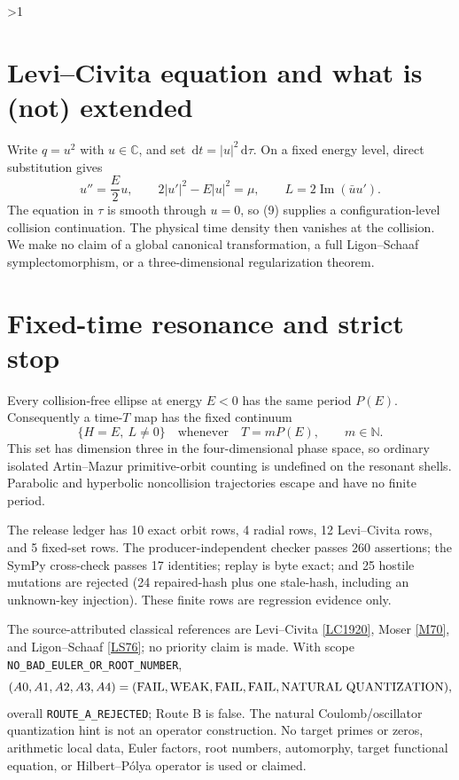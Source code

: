 \documentclass[9pt]{extarticle}
\newcommand{\C}{\mathbb C}
\newcommand{\dd}{\,\mathrm d}
\begin{document}
\ifnum\CRevisionRound>1
\section{Levi--Civita equation and what is (not) extended}
Write \(q=u^2\) with \(u\in\C\), and set \(\dd t=|u|^2\dd\tau\).  On a fixed
energy level, direct substitution gives
\begin{equation}
 u''=\frac E2u,\qquad 2|u'|^2-E|u|^2=\mu,\qquad
 L=2\operatorname{Im}(\bar u u').                           \tag{9}
\end{equation}
The equation in \(\tau\) is smooth through \(u=0\), so (9) supplies a
configuration-level collision continuation.  The physical time density then
vanishes at the collision.  We make no claim of a global canonical
transformation, a full Ligon--Schaaf symplectomorphism, or a three-dimensional
regularization theorem.

\section{Fixed-time resonance and strict stop}
Every collision-free ellipse at energy \(E<0\) has the same period \(P(E)\).
Consequently a time-\(T\) map has the fixed continuum
\[
 \{H=E,\ L\ne0\}\quad\text{whenever}\quad T=mP(E),\qquad m\in\mathbb N. \tag{10}
\]
This set has dimension three in the four-dimensional phase space, so ordinary
isolated Artin--Mazur primitive-orbit counting is undefined on the resonant
shells.  Parabolic and hyperbolic noncollision trajectories escape and have no
finite period.

The release ledger has 10 exact orbit rows, 4 radial rows, 12 Levi--Civita rows,
and 5 fixed-set rows.  The producer-independent checker passes 260 assertions;
the SymPy cross-check passes 17 identities; replay is byte exact; and 25
hostile mutations are rejected (24 repaired-hash plus one stale-hash, including
an unknown-key injection).  These finite rows are regression evidence only.

The source-attributed classical references are Levi--Civita
\href{https://doi.org/10.1007/BF02404404}{[LC1920]}, Moser
\href{https://doi.org/10.1002/cpa.3160230406}{[M70]}, and Ligon--Schaaf
\href{https://doi.org/10.1016/0034-4877(76)90061-6}{[LS76]}; no priority claim
is made.  With scope \texttt{NO\_BAD\_EULER\_OR\_ROOT\_NUMBER},
\[
 (A0,A1,A2,A3,A4)=({\rm FAIL},{\rm WEAK},{\rm FAIL},{\rm FAIL},
 {\rm NATURAL\ QUANTIZATION}),
\]
overall \texttt{ROUTE\_A\_REJECTED}; Route B is false.  The natural
Coulomb/oscillator quantization hint is not an operator construction.
No target primes or zeros, arithmetic local data, Euler factors, root numbers,
automorphy, target functional equation, or Hilbert--Pólya operator is used or
claimed.
\end{document}
